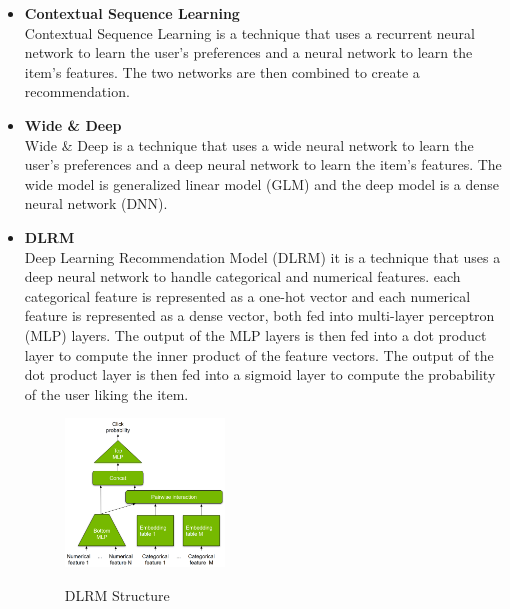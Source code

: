 \begin{itemize}
\begin{figure}[H]
    \end{figure}
    \item \textbf{Contextual Sequence Learning} \\ Contextual Sequence Learning is a technique that uses a recurrent neural network to learn the user's preferences and a neural network to learn the item's features. The two networks are then combined to create a recommendation.
    \item \textbf{Wide \& Deep} \\ Wide \& Deep is a technique that uses a wide neural network to learn the user's preferences and a deep neural network to learn the item's features. The wide model is generalized linear model (GLM) and the deep model is a dense neural network (DNN).
    \item \textbf{DLRM} \\ Deep Learning Recommendation Model (DLRM) it is a technique that uses a deep neural network to handle categorical and numerical features. each categorical feature is represented as a one-hot vector and each numerical feature is represented as a dense vector, both fed into multi-layer perceptron (MLP) layers. The output of the MLP layers is then fed into a dot product layer to compute the inner product of the feature vectors. The output of the dot product layer is then fed into a sigmoid layer to compute the probability of the user liking the item.
    \begin{figure}[H]
        \centering
        \includegraphics[width=0.4\textwidth]{assets/dlrm.png}
        \caption{DLRM Structure}
        \label{fig:dlrm}
        \cite{NvidiaRecSys}
    \end{figure}
\end{itemize}